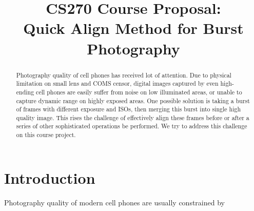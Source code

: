 \documentclass[conference, 12pt]{IEEEtran}
\begin{document}
\title{CS270 Course Proposal:\\
Quick Align Method for Burst Photography}

\author{
}

\maketitle

\begin{abstract}
    Photography quality of cell phones has received lot of attention. Due to physical
    limitation on small lens and COMS censor, digital images captured by even high-ending
    cell phones are easily suffer from noise on low illuminated areas, or unable to capture
    dynamic range on highly exposed areas. One possible solution is taking a burst of frames with different
    exposure and ISOs, then merging this burst into single high quality image.
    This rises the challenge of effectively align these frames before or after a series
    of other sophisticated operations be performed. 
    We try to address this challenge on this course project.
\end{abstract}

\section{Introduction}
Photography quality of modern cell phones are usually constrained by
\end{document}
